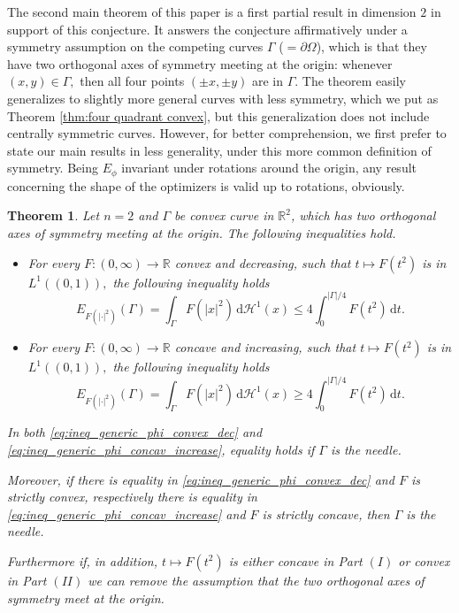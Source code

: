 \documentclass[10pt,leqno]{amsart}
\newcommand{\R}[0]{\mathbb{R}}
\newcommand{\dd}{\, \mathrm{d}}
\newcommand{\delomega}{\partial\Omega}
\newcommand{\dHo}{\, \mathrm{d} \mathcal{H}^{1}}
\newtheorem{Theorem}{Theorem}
\numberwithin{Theorem}{section}
\theoremstyle{definition}
\theoremstyle{remark}
\numberwithin{equation}{section}
\numberwithin{equation}{section}
\begin{document}
The second main theorem of this paper is a first partial result in dimension $2$ in support of this conjecture. It answers the conjecture affirmatively under a symmetry assumption on the competing curves $\Gamma$ ($=\delomega$), which is that they have two orthogonal axes of symmetry meeting at the origin: whenever $(x,y)\in\Gamma,$ then all four points $(\pm x,\pm y)$ are in $\Gamma$.  The theorem easily generalizes to slightly more general curves with less symmetry, which we put as Theorem \ref{thm:four quadrant convex}, but this generalization does not include centrally symmetric curves. However, for better comprehension, we first prefer to state our main results in less generality,  under this more common definition of symmetry. 
Being $E_\phi$ invariant under rotations around the origin, any result concerning the shape of the optimizers is valid up to rotations, obviously. 


\begin{Theorem} \label{Thm:general_phi}
    Let $n=2$ and $\Gamma$ be  convex curve in $\R^2$, which has two orthogonal axes of symmetry meeting at the origin.  The following inequalities hold.
    \begin{itemize}
        \item[(I)]  For every $F : (0,\infty) \to \R$ convex and decreasing, such that  $t\mapsto F(t^2)$ is in $L^1((0,1)),$ the following inequality holds
        \begin{equation} \label{eq:ineq_generic_phi_convex_dec}
       E_{F(|\cdot|^2)}(\Gamma) =\int_{\Gamma} F(|x|^2) \dHo(x) \leq 4 \int_0^{|\Gamma|/4} F(t^2) \dd t.
        \end{equation}
        \item[(II)] For every $F : (0,\infty) \to \R$ concave and increasing, such that  $t\mapsto F(t^2)$ is in $L^1((0,1)),$ the following inequality holds
        \begin{equation} \label{eq:ineq_generic_phi_concav_increase}
            E_{F(|\cdot|^2)}(\Gamma) = \int_{\Gamma} F(|x|^2) \dHo(x) \geq 4 \int_0^{|\Gamma|/4} F(t^2) \dd t.
        \end{equation}
    \end{itemize}
    In both \eqref{eq:ineq_generic_phi_convex_dec} and \eqref{eq:ineq_generic_phi_concav_increase}, equality holds if $\Gamma$ is the needle.

    Moreover, if there is equality in \eqref{eq:ineq_generic_phi_convex_dec} and $F$ is strictly convex, respectively there is equality in \eqref{eq:ineq_generic_phi_concav_increase} and $F$ is strictly concave, then $\Gamma$ is the needle. 
    
   Furthermore if, in addition, $t \mapsto F(t^2)$ is either concave in Part $(I)$ or convex in Part $(II)$ we can remove the assumption that the two orthogonal axes of symmetry meet at the origin.
    \end{Theorem}
\end{document}
